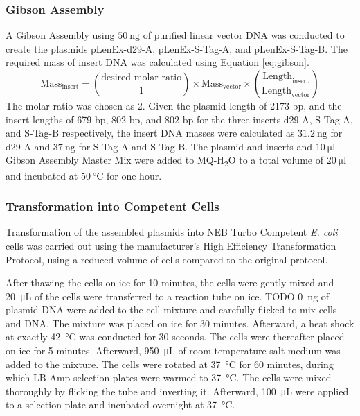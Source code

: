 \subsubsection{Gibson Assembly}
A Gibson Assembly using $\SI{50}{\nano\gram}$ of purified linear vector DNA was conducted to create the plasmids pLenEx-d29-A, pLenEx-S-Tag-A, and pLenEx-S-Tag-B. The required mass of insert DNA was calculated using Equation \ref{eq:gibson}.
\begin{equation}\label{eq:gibson}
\text{Mass}_{\text{insert}} = \left(\frac{\text{desired molar ratio}}{1}\right) \times \text{Mass}_{\text{vector}} \times \left(\frac{\text{Length}_{\text{insert}}}{\text{Length}_{\text{vector}}}\right)
\end{equation}
The molar ratio was chosen as 2. 
Given the plasmid length of 2173 bp, and the insert lengths of 679 bp, 802 bp, and 802 bp for the three inserts d29-A, S-Tag-A, and S-Tag-B respectively, the insert DNA masses were calculated as $\SI{31.2}{\nano\gram}$ for d29-A and $\SI{37}{\nano\gram}$ for S-Tag-A and S-Tag-B. 
The plasmid and inserts and $\SI{10}{\micro\litre}$ Gibson Assembly\textsuperscript{\textregistered} Master Mix were added to MQ-H\textsubscript{2}O to a total volume of $\SI{20}{\micro\litre}$ and incubated at $\SI{50}{\degreeCelsius}$ for one hour. 

\subsubsection{Transformation into Competent Cells}
Transformation of the assembled plasmids into NEB\textsuperscript{\textregistered} Turbo Competent \emph{E. coli} cells was carried out using the manufacturer's High Efficiency Transformation Protocol, using a reduced volume of cells compared to the original protocol.

After thawing the cells on ice for 10 minutes, the cells were gently mixed and \SI{20}{\micro\liter} of the cells were transferred to a reaction tube on ice. TODO \SI{0}{\nano\gram} of plasmid DNA were added to the cell mixture and carefully flicked to mix cells and DNA. The mixture was placed on ice for 30 minutes. Afterward, a heat shock at exactly \SI{42}{\celsius} was conducted for 30 seconds. The cells were thereafter placed on ice for 5 minutes. Afterward, \SI{950}{\micro\liter} of room temperature salt medium was added to the mixture. The cells were rotated at \SI{37}{\celsius} for 60 minutes, during which LB-Amp selection plates were warmed to \SI{37}{\celsius}. The cells were mixed thoroughly by flicking the tube and inverting it. Afterward, \SI{100}{\micro\liter} were applied to a selection plate and incubated overnight at \SI{37}{\celsius}.

